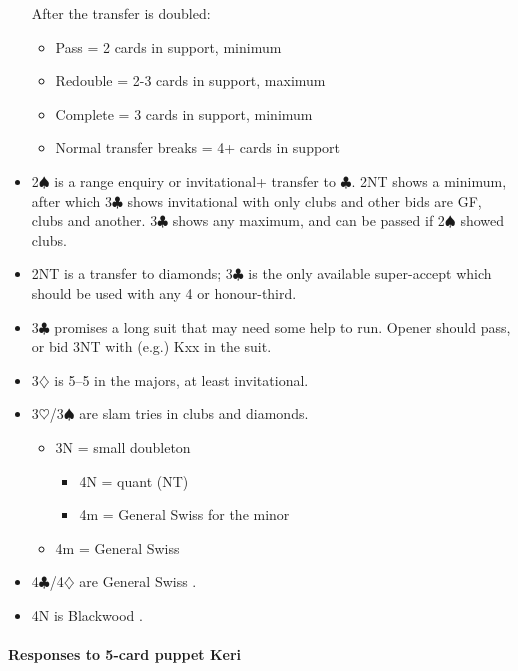 \documentclass[a4paper,14pt]{extarticle}
\begin{document}
\begin{itemize}
After the transfer is doubled:

	\begin{itemize}
	\item Pass = 2 cards in support, minimum
	\item Redouble = 2-3 cards in support, maximum
	\item Complete = 3 cards in support, minimum
	\item Normal transfer breaks = 4+ cards in support
	\end{itemize}

\item 2$\spadesuit$ is a range enquiry or invitational+ transfer to
$\clubsuit$.  2NT shows a minimum, after which 3$\clubsuit$ shows invitational
with only clubs and other bids are GF, clubs and another.  3$\clubsuit$ shows
any maximum, and can be passed if 2$\spadesuit$ showed clubs.

\item 2NT is a transfer to diamonds; 3$\clubsuit$ is the only available super-accept which 
should be used with any 4 or honour-third.

\item 3$\clubsuit$ promises a long suit that may need some help to run.  Opener should
pass, or bid 3NT with (e.g.) Kxx in the suit.

\item 3$\diamondsuit$ is 5--5 in the majors, at least invitational.

\item 3$\heartsuit$/3$\spadesuit$ are slam tries in clubs and diamonds.
	\begin{itemize}
	\item 3N = small doubleton
		\begin{itemize}
		\item 4N = quant (NT)
		\item 4m = General Swiss  for the minor
		\end{itemize}
	\item 4m = General Swiss 
	\end{itemize}

\item 4$\clubsuit$/4$\diamondsuit$ are General Swiss .

\item 4N is Blackwood .

\end{itemize}

\paragraph{Responses to 5-card puppet Keri}
\label{note:8a}
\end{document}
